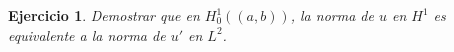 \documentclass[11pt]{report}
\newtheorem{ex}{Ejercicio}
\newenvironment{solution}{\begin{proof}[Solución]}{\end{proof}}
\newcommand{\Ldos}{L^2}
\newcommand{\Huno}{H^1}
\begin{document}




\begin{ex}
Demostrar que en $\Huno_0((a, b))$, la norma de $u$ en ${\Huno}$ es equivalente a la norma de $u'$ en ${\Ldos}$.
\end{ex}



\end{document}

